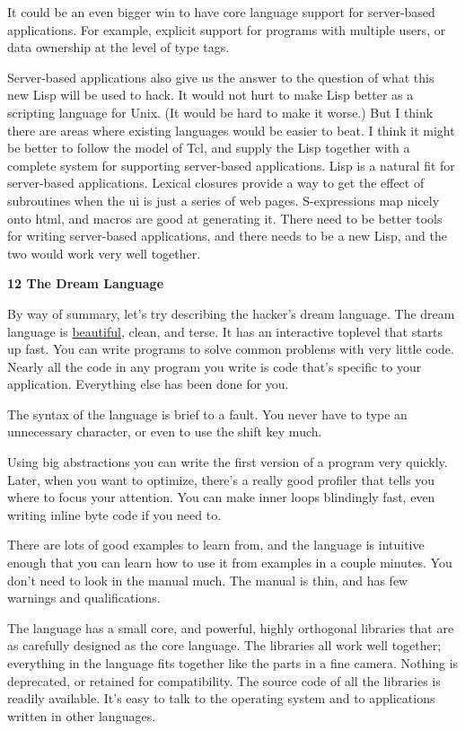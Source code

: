 It could be an even bigger win to have core language support for
server-based applications. For example, explicit support for programs
with multiple users, or data ownership at the level of type tags.

Server-based applications also give us the answer to the question of
what this new Lisp will be used to hack. It would not hurt to make Lisp
better as a scripting language for Unix. (It would be hard to make it
worse.) But I think there are areas where existing languages would be
easier to beat. I think it might be better to follow the model of Tcl,
and supply the Lisp together with a complete system for supporting
server-based applications. Lisp is a natural fit for server-based
applications. Lexical closures provide a way to get the effect of
subroutines when the ui is just a series of web pages. S-expressions map
nicely onto html, and macros are good at generating it. There need to be
better tools for writing server-based applications, and there needs to
be a new Lisp, and the two would work very well together.

\textbf{12 The Dream Language}

By way of summary, let's try describing the hacker's dream language. The
dream language is \href{taste.html}{beautiful}, clean, and terse. It has
an interactive toplevel that starts up fast. You can write programs to
solve common problems with very little code. Nearly all the code in any
program you write is code that's specific to your application.
Everything else has been done for you.

The syntax of the language is brief to a fault. You never have to type
an unnecessary character, or even to use the shift key much.

Using big abstractions you can write the first version of a program very
quickly. Later, when you want to optimize, there's a really good
profiler that tells you where to focus your attention. You can make
inner loops blindingly fast, even writing inline byte code if you need
to.

There are lots of good examples to learn from, and the language is
intuitive enough that you can learn how to use it from examples in a
couple minutes. You don't need to look in the manual much. The manual is
thin, and has few warnings and qualifications.

The language has a small core, and powerful, highly orthogonal libraries
that are as carefully designed as the core language. The libraries all
work well together; everything in the language fits together like the
parts in a fine camera. Nothing is deprecated, or retained for
compatibility. The source code of all the libraries is readily
available. It's easy to talk to the operating system and to applications
written in other languages.

